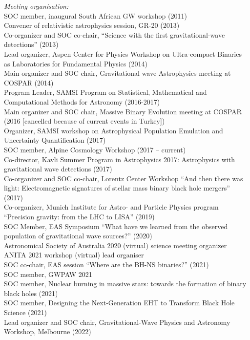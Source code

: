 \documentclass[margin,line]{res}
\begin{document}
\begin{resume}
{\it Meeting organisation:}\\
SOC member, inaugural South African GW workshop (2011)\\
Convener of relativistic astrophysics session, GR-20 (2013)\\
Co-organizer and SOC co-chair, ``Science with the first gravitational-wave detections'' (2013)\\
Lead organizer, Aspen Center for Physics Workshop on Ultra-compact Binaries as Laboratories for Fundamental Physics (2014)\\
Main organizer and SOC chair, Gravitational-wave Astrophysics meeting at COSPAR (2014)\\
Program Leader, SAMSI Program on Statistical, Mathematical and Computational Methods for Astronomy (2016-2017)\\
Main organizer and SOC chair, Massive Binary Evolution meeting at COSPAR (2016 [cancelled because of current events in Turkey])\\
Organizer, SAMSI workshop on Astrophysical Population Emulation and Uncertainty Quantification (2017)\\
SOC member, Alpine Cosmology Workshop (2017 -- current)\\
Co-director, Kavli Summer Program in Astrophysics 2017: Astrophysics with gravitational wave detections (2017)\\
Co-organizer and SOC co-chair, Lorentz Center Workshop ``And then there was light:  
Electromagnetic signatures of stellar mass binary black hole mergers'' (2017)\\
Co-organizer, Munich Institute for Astro- and Particle Physics program ``Precision gravity: from the LHC to LISA'' (2019)\\
SOC Member, EAS Symposium ``What have we learned from the observed population of gravitational wave sources?'' (2020)\\
Astronomical Society of Australia 2020 (virtual) science meeting organizer\\
ANITA 2021 workshop (virtual) lead organiser\\
SOC co-chair, EAS session ``Where are the BH-NS binaries?'' (2021)\\
SOC member, GWPAW 2021\\
SOC member, Nuclear burning in massive stars: towards the formation of binary black holes (2021)\\
SOC member, Designing the Next-Generation EHT to Transform Black Hole Science (2021)\\
Lead organizer and SOC chair, Gravitational-Wave Physics and Astronomy Workshop, Melbourne (2022)\\


\end{resume}
\end{document}
